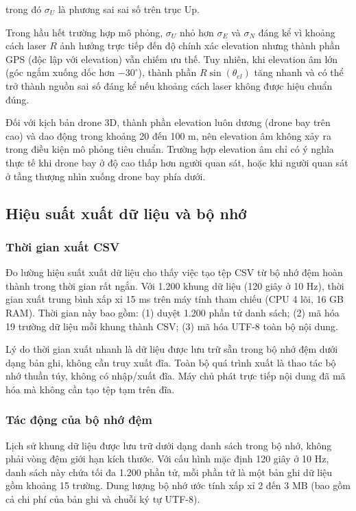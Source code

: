 trong đó $\sigma_U$ là phương sai sai số trên trục Up.

Trong hầu hết trường hợp mô phỏng, $\sigma_U$ nhỏ hơn $\sigma_E$ và $\sigma_N$ đáng kể vì khoảng cách laser $R$ ảnh hưởng trực tiếp đến độ chính xác elevation nhưng thành phần GPS (độc lập với elevation) vẫn chiếm ưu thế. Tuy nhiên, khi elevation âm lớn (góc ngắm xuống dốc hơn $-30^{\circ}$), thành phần $R \sin(\theta_{el})$ tăng nhanh và có thể trở thành nguồn sai số đáng kể nếu khoảng cách laser không được hiệu chuẩn đúng.

Đối với kịch bản drone 3D, thành phần elevation luôn dương (drone bay trên cao) và dao động trong khoảng 20 đến 100 m, nên elevation âm không xảy ra trong điều kiện mô phỏng tiêu chuẩn. Trường hợp elevation âm chỉ có ý nghĩa thực tế khi drone bay ở độ cao thấp hơn người quan sát, hoặc khi người quan sát ở tầng thượng nhìn xuống drone bay phía dưới.

\subsection{Hiệu suất xuất dữ liệu và bộ nhớ}

\subsubsection{Thời gian xuất CSV}

\hspace{0.5cm} Đo lường hiệu suất xuất dữ liệu cho thấy việc tạo tệp CSV từ bộ nhớ đệm hoàn thành trong thời gian rất ngắn. Với 1.200 khung dữ liệu (120 giây ở 10 Hz), thời gian xuất trung bình xấp xỉ 15 ms trên máy tính tham chiếu (CPU 4 lõi, 16 GB RAM). Thời gian này bao gồm: (1) duyệt 1.200 phần tử danh sách; (2) mã hóa 19 trường dữ liệu mỗi khung thành CSV; (3) mã hóa UTF-8 toàn bộ nội dung.

Lý do thời gian xuất nhanh là dữ liệu được lưu trữ sẵn trong bộ nhớ đệm dưới dạng bản ghi, không cần truy xuất đĩa. Toàn bộ quá trình xuất là thao tác bộ nhớ thuần túy, không có nhập/xuất đĩa. Máy chủ phát trực tiếp nội dung đã mã hóa mà không cần tạo tệp tạm trên đĩa.

\subsubsection{Tác động của bộ nhớ đệm}

\hspace{0.5cm} Lịch sử khung dữ liệu được lưu trữ dưới dạng danh sách trong bộ nhớ, không phải vòng đệm giới hạn kích thước. Với cấu hình mặc định 120 giây ở 10 Hz, danh sách này chứa tối đa 1.200 phần tử, mỗi phần tử là một bản ghi dữ liệu gồm khoảng 15 trường. Dung lượng bộ nhớ ước tính xấp xỉ 2 đến 3 MB (bao gồm cả chi phí của bản ghi và chuỗi ký tự UTF-8).

